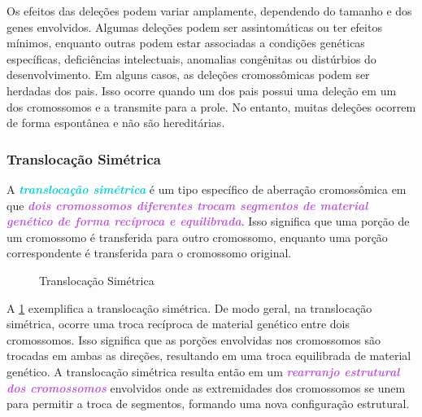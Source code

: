\documentclass[11pt,a4paper]{article}
\begin{document}
	Os efeitos das deleções podem variar amplamente, dependendo do tamanho e dos genes envolvidos. Algumas deleções podem ser assintomáticas ou ter efeitos mínimos, enquanto outras podem estar associadas a condições genéticas específicas, deficiências intelectuais, anomalias congênitas ou distúrbios do desenvolvimento. Em alguns casos, as deleções cromossômicas podem ser herdadas dos pais. Isso ocorre quando um dos pais possui uma deleção em um dos cromossomos e a transmite para a prole. No entanto, muitas deleções ocorrem de forma espontânea e não são hereditárias.

\subsubsection*{Translocação Simétrica}

	A \textcolor{DarkTurquoise}{\textbf{\textit{translocação simétrica}}} é um tipo específico de aberração cromossômica em que \textcolor{MediumOrchid}{\textbf{\textit{dois cromossomos diferentes trocam segmentos de material genético de forma recíproca e equilibrada}}}. Isso significa que uma porção de um cromossomo é transferida para outro cromossomo, enquanto uma porção correspondente é transferida para o cromossomo original.

	\begin{figure}
		\caption{Translocação Simétrica	}
		\label{fig:translocacaoSimetrica}
	\end{figure}

	A \ref{fig:translocacaoSimetrica} exemplifica a translocação simétrica. De modo geral, na translocação simétrica, ocorre uma troca recíproca de material genético entre dois cromossomos. Isso significa que as porções envolvidas nos cromossomos são trocadas em ambas as direções, resultando em uma troca equilibrada de material genético. A translocação simétrica resulta então em um \textcolor{MediumOrchid}{\textbf{\textit{rearranjo estrutural dos cromossomos}}} envolvidos onde as extremidades dos cromossomos se unem para permitir a troca de segmentos, formando uma nova configuração estrutural.
	
\end{document}
